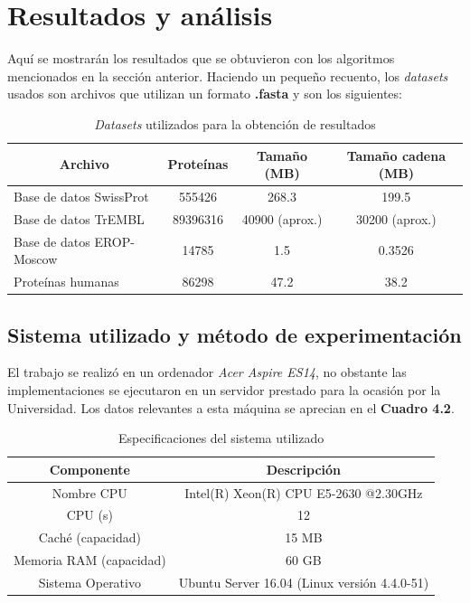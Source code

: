 \chapter{Resultados y análisis}

Aquí se mostrarán los resultados que se obtuvieron con los algoritmos mencionados en la sección anterior. Haciendo un pequeño recuento, los \textit{datasets} usados son archivos que utilizan un formato \textbf{.fasta} y son los siguientes:

\begin{table}[h]
\centering
\begin{tabular}{|l|c|c|c|}
\hline
\multicolumn{1}{|c|}{\textbf{Archivo}} & \textbf{Proteínas} & \textbf{Tamaño (MB)} & \textbf{Tamaño cadena (MB)} \\ \hline
Base de datos SwissProt    & 555426                & 268.3                & 199.5              \\
Base de datos TrEMBL        & 89396316              & 40900 (aprox.)       & 30200 (aprox.)     \\
Base de datos EROP-Moscow        & 14785                 & 1.5                  & 0.3526                \\
Proteínas humanas     & 86298                 & 47.2                 & 38.2               \\ \hline
\end{tabular}
\caption{\textit{Datasets} utilizados para la obtención de resultados}
\label{tb:labelr1}
\end{table} 

\section{Sistema utilizado y método de experimentación}

El trabajo se realizó en un ordenador \textit{Acer Aspire ES14}, no obstante las implementaciones se ejecutaron en un servidor prestado para la ocasión por la Universidad. Los datos relevantes a esta máquina se aprecian en el \textbf{Cuadro 4.2}.

\begin{table}[h]
\centering
\begin{tabular}{|c|c|}
\hline
\textbf{Componente}     & \textbf{Descripción}                         \\ \hline
Nombre CPU              & Intel(R) Xeon(R) CPU E5-2630 @2.30GHz        \\
CPU (s)                 & 12                                           \\
Caché (capacidad)       & 15 MB                                        \\
Memoria RAM (capacidad) & 60 GB                                        \\
Sistema Operativo       & Ubuntu Server 16.04 (Linux versión 4.4.0-51) \\ \hline
\end{tabular}
\caption{Especificaciones del sistema utilizado}
\label{tb:labelr2}
\end{table}

